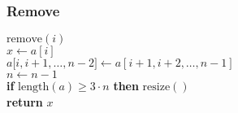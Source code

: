 \documentclass{beamer}
\begin{document}
\begin{frame}
\frametitle{Remove}
\begin{oframed}
\begin{flushleft}
\hspace*{1em} $\ensuremath{\mathrm{remove}(\ensuremath{\mathit{i}})}$ \\

\hspace*{1em} \hspace*{1em} $\ensuremath{\ensuremath{\mathit{x}} \gets  \ensuremath{\ensuremath{\mathit{a}}[\ensuremath{\mathit{i}}]}}$\\
\hspace*{1em} \hspace*{1em} $\ensuremath{\ensuremath{\mathit{a}}[\ensuremath{\ensuremath{\mathit{i}},\ensuremath{\mathit{i}}+1,\ldots,\ensuremath{\ensuremath{\mathit{n}}-2}]} \gets  \ensuremath{\ensuremath{\mathit{a}}[\ensuremath{\ensuremath{\mathit{i}}+1,\ensuremath{\mathit{i}}+2,\ldots,\ensuremath{\mathit{n}}-1}]}}$\\
\hspace*{1em} \hspace*{1em} $\ensuremath{\ensuremath{\mathit{n}} \gets  \ensuremath{\ensuremath{\mathit{n}} - 1}}$\\
\hspace*{1em} \hspace*{1em} {\color{black} \textbf{if}} $\ensuremath{\mathrm{length}(\ensuremath{\mathit{a}}) \ge 3\cdot n}$ {\color{black} \textbf{then}}  $\ensuremath{\mathrm{resize}()}$\\
\hspace*{1em} \hspace*{1em} {\color{black} \textbf{return}} $\ensuremath{\ensuremath{\mathit{x}}}$\\
\end{flushleft}
\end{oframed}
\end{frame}
\end{document}
